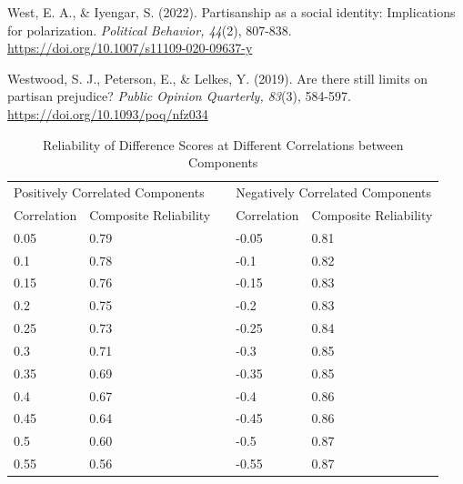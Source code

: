\documentclass[authordate, meta, issue]{jote-new-article}
\begin{document}
	West, E. A., \& Iyengar, S. (2022). Partisanship as a social identity: Implications for polarization. \emph{Political Behavior, 44}(2), 807-838. \url{https://doi.org/10.1007/s11109-020-09637-y} 



	Westwood, S. J., Peterson, E., \& Lelkes, Y. (2019). Are there still limits on partisan prejudice? \emph{Public Opinion Quarterly, 83}(3), 584-597. \url{https://doi.org/10.1093/poq/nfz034}



\clearpage

\onecolumn




	\begin{table}[H]
		\begin{fullwidth}
			
		\centering
		\caption{Reliability of Difference Scores at Different Correlations between Components}
		\begin{tabular}{@{} l l l l l@{}}
			\hline \multicolumn{2}{l}{Positively Correlated Components} &  &
			\multicolumn{2}{l}{Negatively Correlated Components} \\

			 Correlation & Composite Reliability &  & Correlation & Composite Reliability
			\\

			 0.05 & 0.79 &  & -0.05 & 0.81 \\

			 0.1 & 0.78 &  & -0.1 & 0.82 \\

			 0.15 & 0.76 &  & -0.15 & 0.83 \\

			 0.2 & 0.75 &  & -0.2 & 0.83 \\

			 0.25 & 0.73 &  & -0.25 & 0.84 \\

			 0.3 & 0.71 &  & -0.3 & 0.85 \\

			 0.35 & 0.69 &  & -0.35 & 0.85 \\

			 0.4 & 0.67 &  & -0.4 & 0.86 \\

			 0.45 & 0.64 &  & -0.45 & 0.86 \\

			 0.5 & 0.60 &  & -0.5 & 0.87 \\

			 0.55 & 0.56 &  & -0.55 & 0.87 \\


\end{tabular}
\end{fullwidth}
\end{table}
\end{document}
